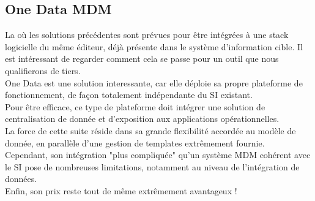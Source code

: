 \subsection{One Data MDM}

La où les solutions précédentes sont prévues pour être intégrées à une stack logicielle du même éditeur, déjà présente dans le système d'information cible. Il est intéressant  de regarder comment cela se passe pour un outil que nous qualifierons de tiers. \\
One Data est une solution interessante, car elle déploie sa propre plateforme de fonctionnement, de façon totalement indépendante du SI existant.\\
Pour être efficace, ce type de plateforme doit intégrer une solution de centralisation de donnée et d'exposition aux applications opérationnelles.\\
La force de cette suite réside dans sa grande flexibilité accordée au modèle de donnée, en parallèle d'une gestion de templates extrêmement fournie. \\
Cependant, son intégration "plus compliquée" qu'un système MDM cohérent avec le SI pose de nombreuses limitations, notamment au niveau de l'intégration de données.\\
Enfin, son prix reste tout de même extrêmement avantageux !\\

